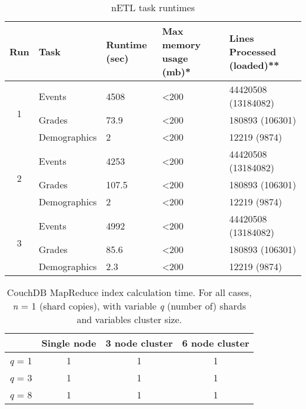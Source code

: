 \begin{table}[]
    \centering
    \caption{nETL task runtimes}
    \label{netl-runtimes}
    \begin{tabular}{cllll}
        \multicolumn{1}{l}{Run} & Task         & Runtime (sec) & Max memory usage (mb)* & Lines Processed (loaded)** \\ \hline
        \multirow{3}{*}{1}      & Events       & 4508          & \textless 200          & 44420508 (13184082)        \\
                                & Grades       & 73.9          & \textless 200          & 180893 (106301)            \\
                                & Demographics & 2             & \textless 200          & 12219 (9874)               \\
        \multirow{3}{*}{2}      & Events       & 4253          & \textless 200          & 44420508 (13184082)        \\
                                & Grades       & 107.5         & \textless 200          & 180893 (106301)            \\
                                & Demographics & 2             & \textless 200          & 12219 (9874)               \\
        \multirow{3}{*}{3}      & Events       & 4992          & \textless 200          & 44420508 (13184082)        \\
                                & Grades       & 85.6          & \textless 200          & 180893 (106301)            \\
                                & Demographics & 2.3           & \textless 200          & 12219 (9874)               \\ \cline{2-5}
    \end{tabular}
\end{table}

\begin{table}[]
    \centering
    \caption{CouchDB MapReduce index calculation time. For all cases, \textit{n} = 1 (shard copies), with variable \textit{q} (number of) shards and variables cluster size.}
    \label{couch-indexing}
    \begin{tabular}{cccc}
                       & Single node & 3 node cluster & 6 node cluster \\ \hline
        \textit{q} = 1 & 1           & 1              & 1              \\
        \textit{q} = 3 & 1           & 1              & 1              \\
        \textit{q} = 8 & 1           & 1              & 1              \\ \hline
    \end{tabular}
\end{table}

